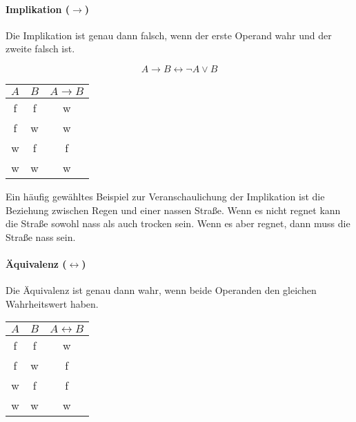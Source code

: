 \documentclass[../main.tex]{subfiles}
\begin{document}
        \paragraph{Implikation ($\rightarrow$)}
            Die Implikation ist genau dann falsch, wenn der erste Operand wahr und der zweite falsch ist.
            
			\begin{equation}
                A \rightarrow B \leftrightarrow \neg A \vee B
            \end{equation}
            
            \begin{center}
                \begin{tabular}{ | c | c | c | }
                    \hline
                    $A$ & $B$  & $A \rightarrow B$ \\\hline
                    f & f & w \\
                    f & w & w \\
                    w & f & f \\
                    w & w & w \\\hline
                \end{tabular}
            \end{center}
            
            Ein häufig gewähltes Beispiel zur Veranschaulichung der Implikation ist die Beziehung zwischen Regen und einer nassen Straße. Wenn es nicht regnet kann die Straße sowohl nass als auch trocken sein. Wenn es aber regnet, dann muss die Straße nass sein.
            
        \paragraph{Äquivalenz ($\leftrightarrow$)}
            Die Äquivalenz ist genau dann wahr, wenn beide Operanden den gleichen Wahrheitswert haben.
            
            \begin{center}
                \begin{tabular}{ | c | c | c | }
                    \hline
                    $A$ & $B$  & $A \leftrightarrow B$ \\\hline
                    f & f & w \\
                    f & w & f \\
                    w & f & f \\
                    w & w & w \\\hline
                \end{tabular}
            \end{center}
                
\end{document}
